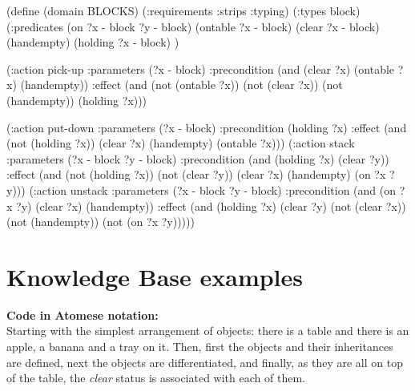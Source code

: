 \begin{python}
(define (domain BLOCKS)
  (:requirements :strips :typing)
  (:types block)
  (:predicates (on ?x - block ?y - block)
	       (ontable ?x - block)
	       (clear ?x - block)
	       (handempty)
	       (holding ?x - block)
	       )

  (:action pick-up
	     :parameters (?x - block)
	     :precondition (and (clear ?x) (ontable ?x) 
  			     (handempty))
	     :effect
	     (and (not (ontable ?x))
		   (not (clear ?x))
		   (not (handempty))
		   (holding ?x)))

  (:action put-down
	     :parameters (?x - block)
	     :precondition (holding ?x)
	     :effect
	     (and (not (holding ?x))
		   (clear ?x)
		   (handempty)
		   (ontable ?x)))
  (:action stack
	     :parameters (?x - block ?y - block)
	     :precondition (and (holding ?x) (clear ?y))
	     :effect
	     (and (not (holding ?x))
		   (not (clear ?y))
		   (clear ?x)
		   (handempty)
		   (on ?x ?y)))
  (:action unstack
	     :parameters (?x - block ?y - block)
	     :precondition (and (on ?x ?y) (clear ?x) 
			     (handempty))
	     :effect
	     (and (holding ?x)
		   (clear ?y)
		   (not (clear ?x))
		   (not (handempty))
		   (not (on ?x ?y)))))
\end{python}


\section{Knowledge Base examples}\label{sec:KB_examples} 

\begin{footnotesize}
\textbf{Code in Atomese notation:} \\
Starting with the simplest arrangement of objects: there is a table and there is an apple, a banana and a tray on it. Then, first the objects and their inheritances are defined, next the objects are differentiated, and finally, as they are all on top of the table, the \textit{clear} status is associated with each of them. \\
\end{footnotesize}

